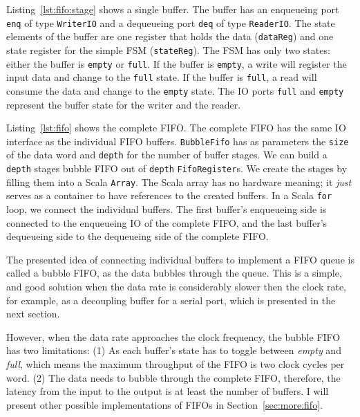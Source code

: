 \documentclass[%
    10pt,
    headinclude, footinclude=false,
    openright, %
    notitlepage,
    cleardoublepage=empty,
    headsepline,
    numbers=noenddot,
    bibliography=totoc, index=totoc,
    ]{scrbook}
\newcommand{\code}[1]{{\lstinline[basicstyle=\small\ttfamily]{#1}}}
\begin{document}

Listing~\ref{lst:fifo:stage} shows a single buffer. The buffer has an enqueueing port
\code{enq} of type \code{WriterIO} and a dequeueing port \code{deq} of type
\code{ReaderIO}. The state elements of the buffer are one register that holds the
data (\code{dataReg}) and one state register for the simple FSM (\code{stateReg}).
The FSM has only two states: either the buffer is \code{empty} or \code{full}.
If the buffer is \code{empty}, a write will register the input data and change
to the \code{full} state.
If the buffer is \code{full}, a read will consume the data and change to the
\code{empty} state.
The IO ports \code{full} and \code{empty} represent the buffer state for
the writer and the reader.


Listing~\ref{lst:fifo} shows the complete FIFO. The complete FIFO has
the same IO interface as the individual FIFO buffers.
\code{BubbleFifo} has as parameters the \code{size} of the data
word and \code{depth} for the number of buffer stages.
We can build a \code{depth} stages bubble FIFO out of \code{depth}
\code{FifoRegister}s. We create the stages by filling them into a Scala \code{Array}.
The Scala array has no hardware meaning; it \emph{just} serves as
a container to have references to the created buffers.
In a Scala \code{for} loop, we connect the individual buffers.
The first buffer's enqueueing side is connected to the enqueueing IO of
the complete FIFO, and the last buffer's dequeueing side to the
dequeueing side of the complete FIFO.


The presented idea of connecting individual buffers to implement a FIFO
queue is called a bubble FIFO, as the data bubbles through the queue.
This is a simple, and good solution when the data rate is considerably slower
then the clock rate, for example, as a decoupling buffer for a serial port, which is presented
in the next section.

However, when the data rate approaches the clock frequency, the bubble FIFO
has two limitations: (1) As each buffer's state has to toggle between \emph{empty} and
\emph{full}, which means the maximum throughput of the FIFO is two clock cycles
per word. (2) The data needs to bubble through the complete FIFO, therefore,
the latency from the input to the output is at least the number of buffers.
I will present other possible implementations of FIFOs in Section~\ref{sec:more:fifo}.
\end{document}
